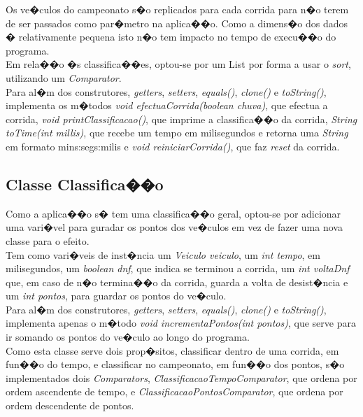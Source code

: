 ﻿\documentclass[10pt,notitlepage]{article}
\begin{document}
Os ve�culos do campeonato s�o replicados para cada corrida para n�o terem de ser passados como par�metro na aplica��o. Como a dimens�o dos dados � relativamente pequena isto n�o tem impacto no tempo de execu��o do programa. \\

Em rela��o �s classifica��es, optou-se por um List por forma a usar o \textit{sort}, utilizando um \textit{Comparator}.  \\

Para al�m dos construtores, \textit{getters}, \textit{setters}, \textit{equals()}, \textit{clone()} e \textit{toString()}, implementa os m�todos \textit{void efectuaCorrida(boolean chuva)}, que efectua a corrida, \textit{void printClassificacao()}, que imprime a classifica��o da corrida, \textit{String toTime(int millis)}, que recebe um tempo em milisegundos e retorna uma \textit{String} em formato mins:segs:milis e \textit{void reiniciarCorrida()}, que faz \textit{reset} da corrida.

\subsection{Classe Classifica��o}

Como a aplica��o s� tem uma classifica��o geral, optou-se por adicionar uma vari�vel para guradar os pontos dos ve�culos em vez de fazer uma nova classe para o efeito. \\

Tem como vari�veis de inst�ncia um \textit{Veiculo veiculo}, um \textit{int tempo}, em milisegundos, um \textit{boolean dnf}, que indica se terminou a corrida, um \textit{int voltaDnf} que, em caso de n�o termina��o da corrida, guarda a volta de desist�ncia e um \textit{int pontos}, para guardar os pontos do ve�culo. \\

Para al�m dos construtores, \textit{getters}, \textit{setters}, \textit{equals()}, \textit{clone()} e \textit{toString()}, implementa apenas o m�todo \textit{void incrementaPontos(int  pontos)}, que serve para ir somando os pontos do ve�culo ao longo do programa. \\

Como esta classe serve dois prop�sitos, classificar dentro de uma corrida, em fun��o do tempo, e classificar no campeonato, em fun��o dos pontos, s�o implementados dois \textit{Comparators}, \textit{ClassificacaoTempoComparator}, que ordena por ordem ascendente de tempo, e \textit{ClassificacaoPontosComparator}, que ordena por ordem descendente de pontos. \\
\end{document}
